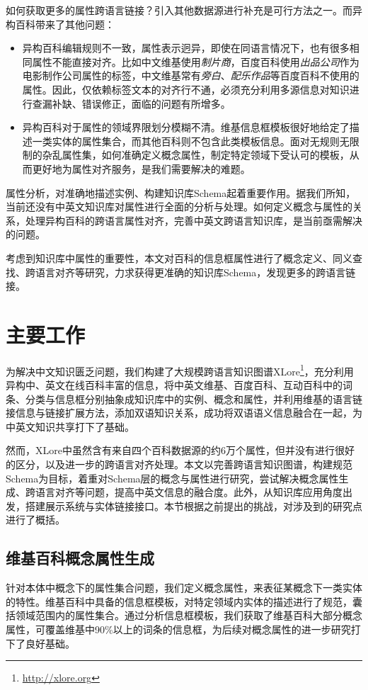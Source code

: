 如何获取更多的属性跨语言链接？引入其他数据源进行补充是可行方法之一。而异构百科带来了其他问题：
\begin{itemize}
\item {\heiti 异构百科编辑规则不一致}，属性表示迥异，即使在同语言情况下，也有很多相同属性不能直接对齐。比如中文维基使用\textit{制片商}，百度百科使用\textit{出品公司}作为电影制作公司属性的标签，中文维基常有\textit{旁白}、\textit{配乐作品}等百度百科不使用的属性。因此，仅依赖标签文本的对齐行不通，必须充分利用多源信息对知识进行查漏补缺、错误修正，面临的问题有所增多。
\item {\heiti 异构百科对于属性的领域界限划分模糊不清}。维基信息框模板很好地给定了描述一类实体的属性集合，而其他百科则不包含此类模板信息。面对无规则无限制的杂乱属性集，如何准确定义概念属性，制定特定领域下受认可的模板，从而更好地为属性对齐服务，是我们需要解决的难题。
\end{itemize}

属性分析，对准确地描述实例、构建知识库Schema起着重要作用。据我们所知，当前还没有中英文知识库对属性进行全面的分析与处理。如何定义概念与属性的关系，处理异构百科的跨语言属性对齐，完善中英文跨语言知识库，是当前亟需解决的问题。

考虑到知识库中属性的重要性，本文对百科的信息框属性进行了概念定义、同义查找、跨语言对齐等研究，力求获得更准确的知识库Schema，发现更多的跨语言链接。

\section{主要工作}
为解决中文知识匮乏问题，我们构建了大规模跨语言知识图谱XLore\footnote{\url{http://xlore.org}}，充分利用异构中、英文在线百科丰富的信息，将中英文维基、百度百科、互动百科中的词条、分类与信息框分别抽象成知识库中的实例、概念和属性，并利用维基的语言链接信息与链接扩展方法\cite{wang2012cross}，添加双语知识关系，成功将双语语义信息融合在一起，为中英文知识共享打下了基础。

然而，XLore中虽然含有来自四个百科数据源的约6万个属性，但并没有进行很好的区分，以及进一步的跨语言对齐处理。本文以完善跨语言知识图谱，构建规范Schema为目标，着重对Schema层的概念与属性进行研究，尝试解决概念属性生成、跨语言对齐等问题，提高中英文信息的融合度。此外，从知识库应用角度出发，搭建展示系统与实体链接接口。本节根据之前提出的挑战，对涉及到的研究点进行了概括。

\subsection{维基百科概念属性生成}
针对本体中概念下的属性集合问题，我们定义概念属性，来表征某概念下一类实体的特性。维基百科中具备的信息框模板，对特定领域内实体的描述进行了规范，囊括领域范围内的属性集合。通过分析信息框模板，我们获取了维基百科大部分概念属性，可覆盖维基中90\%以上的词条的信息框，为后续对概念属性的进一步研究打下了良好基础。


